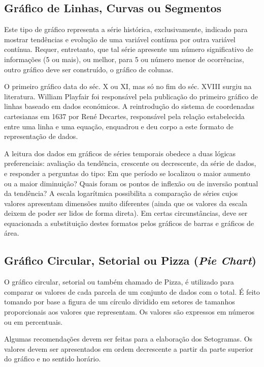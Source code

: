 \subsection{Gráfico de Linhas, Curvas ou Segmentos}

Este tipo de gráfico representa a série histórica, exclusivamente, indicado para mostrar tendências e evolução de uma variável contínua por outra variável contínua. Requer, entretanto, que tal série apresente um número significativo de informações (5 ou mais), ou melhor, para 5 ou número menor de ocorrências, outro gráfico deve ser construído, o gráfico de colunas.\vskip0.3cm

O primeiro gráfico data do séc. X ou XI, mas só no fim do séc. XVIII surgiu na literatura. William Playfair foi responsável pela publicação do primeiro gráfico de linhas baseado em dados económicos. A reintrodução do sistema de coordenadas cartesianas em 1637 por René Decartes, responsável pela relação estabelecida entre uma linha e uma equação, enquadrou e deu corpo a este formato de representação de dados.\vskip0.3cm

A leitura dos dados em gráficos de séries temporais obedece a duas lógicas preferenciais: avaliação da tendência, crescente ou decrescente, da série de dados, e responder a perguntas do tipo: Em que período se localizou o maior aumento ou a maior diminuição? Quais foram os pontos de inflexão ou de inversão pontual da tendência? A escala logarítmica possibilita a comparação de séries cujos valores apresentam dimensões muito diferentes (ainda que os valores da escala deixem de poder ser lidos de forma direta). Em certas circunstâncias, deve ser equacionada a substituição destes formatos pelos gráficos de barras e gráficos de área.


\newpage
\subsection{Gráfico Circular, Setorial ou Pizza (\textit{Pie Chart})}

O gráfico circular, setorial ou também chamado de Pizza, é utilizado para comparar os valores de cada parcela de um conjunto de dados com o total. É feito tomando por base a figura de um círculo dividido em setores de tamanhos proporcionais aos valores que representam. Os valores são expressos em números ou em percentuais. \vskip0.3cm

Algumas recomendações devem ser feitas para a elaboração dos Setogramas. Os valores devem ser apresentados em ordem decrescente a partir da parte superior do gráfico e no sentido horário.\vskip0.3cm

